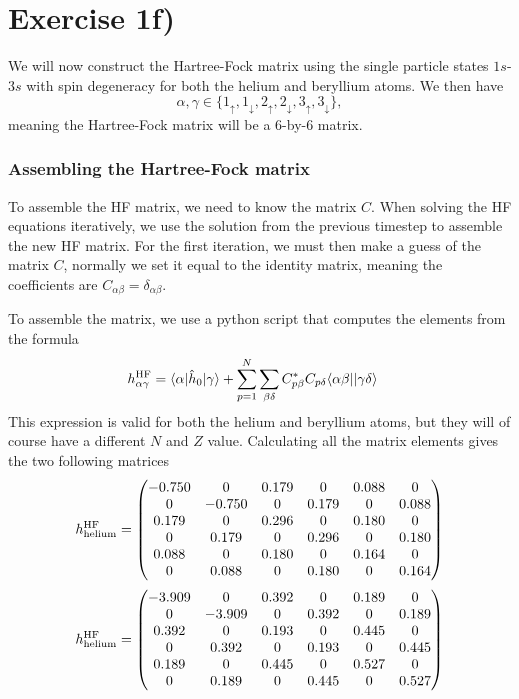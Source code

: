 \documentclass[a4paper, 11pt, notitlepage, english]{article}
\newcommand{\braket}[2]{\langle #1 | #2 \rangle}
\newcommand{\op}[1]{\hat{#1}}
\newcommand{\braopket}[3]{\langle #1 | {#2} | #3 \rangle}
\renewcommand{\d}{{\rm d}}
\renewcommand{\u}{\uparrow}
\renewcommand{\d}{\downarrow}
\begin{document}
\clearpage

\section*{Exercise 1f)}
We will now construct the Hartree-Fock matrix using the single particle states $1s$-$3s$ with spin degeneracy for both the helium and beryllium atoms. We then have
$$\alpha, \gamma \in \{1_\u, 1_\d, 2_\u, 2_\d, 3_\u, 3_\d \},$$
meaning the Hartree-Fock matrix will be a 6-by-6 matrix. 

\subsubsection*{Assembling the Hartree-Fock matrix}
To assemble the HF matrix, we need to know the matrix $C$. When solving the HF equations iteratively, we use the solution from the previous timestep to assemble the new HF matrix. For the first iteration, we must then make a guess of the matrix $C$, normally we set it equal to the identity matrix, meaning the coefficients are $C_{\alpha\beta} = \delta_{\alpha\beta}$. 

To assemble the matrix, we use a python script that computes the elements from the formula
\begin{align*}
h_{\alpha\gamma}^{\rm HF} &= \braopket{\alpha}{\op{h}_0}{\gamma} + \sum_{p=1}^N\sum_{\beta\delta} C_{p\beta}^* C_{p \delta} \braket{\alpha\beta|}{\gamma\delta}
\end{align*}
This expression is valid for both the helium and beryllium atoms, but they will of course have a different $N$ and $Z$ value. Calculating all the matrix elements gives the two following matrices
\begin{align*}
h^{\rm HF}_{\rm helium} =
	\begin{pmatrix}
-0.750 &  0 &  0.179 &  0 &  0.088 &  0   \\
0 &  -0.750 &  0 &  0.179 &  0 &  0.088   \\
0.179 &  0 &  0.296 &  0 &  0.180 &  0   \\
0 &  0.179 &  0 &  0.296 &  0 &  0.180   \\
0.088 &  0 &  0.180 &  0 &  0.164 &  0   \\
0 &  0.088 &  0 &  0.180 &  0 &  0.164   
\end{pmatrix}
\end{align*}
\begin{align*}
h^{\rm HF}_{\rm helium} =
	\begin{pmatrix}
-3.909 &  0 &  0.392 &  0 &  0.189 &  0   \\
0 &  -3.909 &  0 &  0.392 &  0 &  0.189   \\
0.392 &  0 &  0.193 &  0 &  0.445 &  0   \\
0 &  0.392 &  0 &  0.193 &  0 &  0.445   \\
0.189 &  0 &  0.445 &  0 &  0.527 &  0   \\
0 &  0.189 &  0 &  0.445 &  0 &  0.527   
	\end{pmatrix}
\end{align*}
\end{document}
